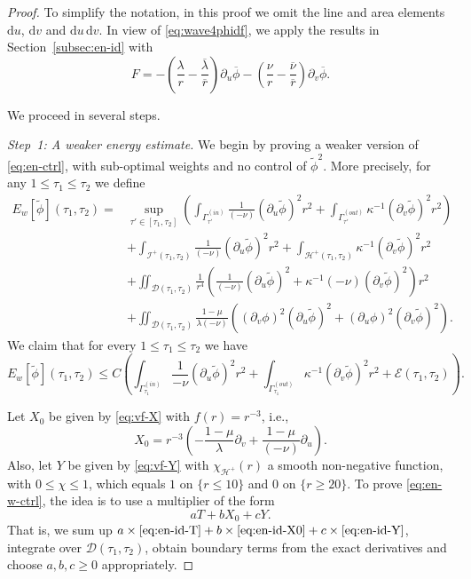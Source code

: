 \documentclass[10pt, reqno]{amsart}
\theoremstyle{definition}
\theoremstyle{remark}
\theoremstyle{conjecture}
\numberwithin{equation}{section}
\newcommand{\set}[1]{\{#1\}}
\newcommand{\ud}{\mathrm{d}}
\newcommand{\rd}{\partial}
\newcommand{\0}{\emptyset}
\newcommand{\Gmm}{\Gamma}
\newcommand{\kpp}{\kappa}
\newcommand{\lmb}{\lambda}
\newcommand{\calD}{\mathcal D}
\newcommand{\calE}{\mathcal E}
\newcommand{\calH}{\mathcal H}
\newcommand{\calI}{\mathcal I}
\newcommand{\dur}{\nu}
\newcommand{\dvr}{\lmb}
\newcommand{\EH}{\calH^{+}}
\newcommand{\pfstep}[1]{\vspace{.5em} {\it \noindent #1.}}
\newcommand{\NI}{\calI^{+}}						%
\newcommand{\phibg}{\overline{\phi}}				%
\newcommand{\dvrbg}{\overline{\dvr}}				%
\newcommand{\durbg}{\overline{\dur}}				%
\newcommand{\rbg}{\overline{r}}					%
\newcommand{\phidf}{\widetilde{\phi}}				%
\begin{document}
\begin{proof}
To simplify the notation, in this proof we omit the line and area elements $\ud u$, $\ud v$ and $\ud u \, \ud v$. In view of \eqref{eq:wave4phidf}, we apply the results in Section~\ref{subsec:en-id} with
\begin{equation*}
	F = - \left( \frac{\dvr}{r} - \frac{\dvrbg}{\rbg} \right) \rd_{u} \phibg - \left( \frac{\dur}{r} - \frac{\durbg}{\rbg} \right) \rd_{v} \phibg.
\end{equation*}

We proceed in several steps. 

\pfstep{Step~1: A weaker energy estimate}
We begin by proving a weaker version of \eqref{eq:en-ctrl}, with sub-optimal weights and no control of $\phidf^{2}$.
More precisely, for any $1 \leq \tau_{1} \leq \tau_{2}$ we define 
\begin{equation*}
\begin{aligned}
	E_{w}[\phidf](\tau_{1}, \tau_{2})
	= & \sup_{\tau' \in [\tau_{1}, \tau_{2}]} \left( \int_{\Gmm^{(in)}_{\tau'}} \frac{1}{(-\dur)} (\rd_{u} \phidf)^{2} r^{2} 
	+ \int_{\Gmm^{(out)}_{\tau'}} \kpp^{-1} (\rd_{v} \phidf)^{2} r^{2}  \right) \\
	& + \int_{\NI(\tau_{1}, \tau_{2})} \frac{1}{(-\dur)} (\rd_{u} \phidf)^{2} r^{2} 
	+ \int_{\EH(\tau_{1}, \tau_{2})} \kpp^{-1} (\rd_{v} \phidf)^{2} r^{2}  \\
	& + \iint_{\calD(\tau_{1}, \tau_{2})} \frac{1}{r^{4}} 
		\left( \frac{1}{(-\dur)} (\rd_{u} \phidf)^{2} + \kpp^{-1} (-\dur) (\rd_{v} \phidf)^{2} \right) r^{2} \\
	& + \iint_{\calD(\tau_{1}, \tau_{2})} \frac{1-\mu}{\dvr (-\dur)} \left((\rd_{v} \phi)^{2} (\rd_{u} \phidf)^{2} + (\rd_{u} \phi)^{2} (\rd_{v} \phidf)^{2} \right) .
\end{aligned}
\end{equation*}
We claim that for every $1 \leq \tau_{1} \leq \tau_{2}$ we have
\begin{equation} \label{eq:en-w-ctrl}
	E_{w}[\phidf](\tau_{1}, \tau_{2}) 
	\leq C \left( \int_{\Gmm^{(in)}_{\tau_{1}}} \frac{1}{-\dur} (\rd_{u} \phidf)^{2} r^{2} 
	+ \int_{\Gmm^{(out)}_{\tau_{1}}} \kpp^{-1} (\rd_{v} \phidf)^{2} r^{2}  + \calE(\tau_{1}, \tau_{2}) \right) .
\end{equation}

Let $X_{0}$ be given by \eqref{eq:vf-X} with $f(r) = r^{-3}$, i.e.,
\begin{equation*}
	X_{0} = r^{-3} \left( - \frac{1-\mu}{\dvr} \rd_{v} + \frac{1-\mu}{(-\dur)} \rd_{u}\right).
\end{equation*}
Also, let $Y$ be given by \eqref{eq:vf-Y} with $\chi_{\EH}(r)$ a smooth non-negative function, with $0\leq \chi\leq 1$, which equals $1$ on $\set{r \leq 10}$ and $0$ on $\set{r \geq 20}$. To prove \eqref{eq:en-w-ctrl}, the idea is to use a multiplier of the form 
\begin{equation*}
a T + b X_{0} + c Y. 
\end{equation*}
That is, we sum up $a \times \eqref{eq:en-id-T} + b \times \eqref{eq:en-id-X0} + c \times \eqref{eq:en-id-Y}$, integrate over $\calD(\tau_{1}, \tau_{2})$, obtain boundary terms from the exact derivatives and choose $a, b, c \geq 0$ appropriately.


\end{proof}
\end{document}
